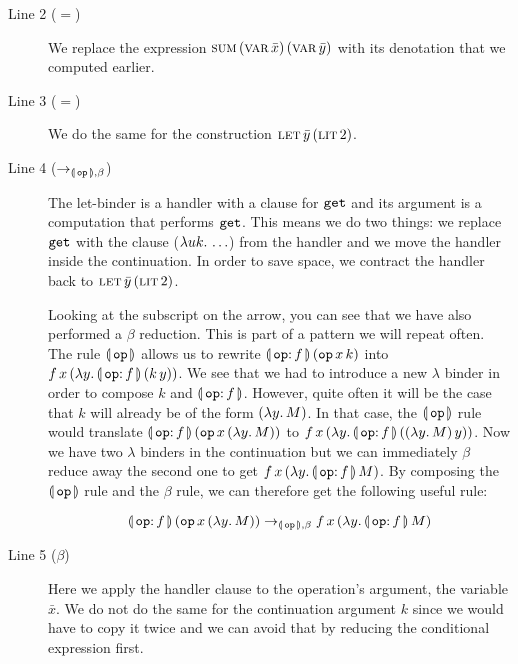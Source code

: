 \begin{description}

  \item[Line 2 ($=$)] We replace the expression
    $\textsc{sum}\,(\textsc{var}\,\bar{x})\,(\textsc{var}\,\bar{y})$ with its denotation that we computed
    earlier.

  \item[Line 3 ($=$)] We do the same for the construction
    $\textsc{let}\,\bar{y}\,(\textsc{lit}\,2)$.

  \item[Line 4 ($\to_{\llparenthesis \, \mathtt{op} \, \rrparenthesis,\beta}$)] The let-binder is a
    handler with a clause for $\mathtt{get}$ and its argument is a computation
    that performs $\mathtt{get}$. This means we do two things: we replace
    $\mathtt{get}$ with the clause ($\lambda u k.\, \ldots$) from the handler and
    we move the handler inside the continuation. In order to save space, we
    contract the handler back to $\textsc{let}\,\bar{y}\,(\textsc{lit}\,2)$.

    Looking at the subscript on the arrow, you can see that we have also
    performed a $\beta$ reduction. This is part of a pattern we will
    repeat often. The rule $\llparenthesis \, \mathtt{op} \, \rrparenthesis$ allows us to rewrite
    $\ap{\banana{\onto{\op{op}}{f}}}{(\app{\op{op}}{x}{k})}$ into
    $\app{f}{x}{(\lam{y}{\ap{\banana{\onto{\op{op}}{f}}}{(\ap{k}{y})}})}$. We
    see that we had to introduce a new $\lambda$ binder in order to compose
    $k$ and $\banana{\onto{\op{op}}{f}}$. However, quite often it will be
    the case that $k$ will already be of the form $(\lambda y.\, M)$. In that
    case, the $\llparenthesis \, \mathtt{op} \, \rrparenthesis$ rule would translate
    $\ap{\banana{\onto{\op{op}}{f}}}{(\app{\op{op}}{x}{(\lam{y}{M})})}$ to
    $\app{f}{x}{(\lam{y}{\ap{\banana{\onto{\op{op}}{f}}}{(\ap{(\lam{y}{M})}{y})}})}$. Now
    we have two $\lambda$ binders in the continuation but we can
    immediately $\beta$ reduce away the second one to get
    $\app{f}{x}{(\lam{y}{\ap{\banana{\onto{\op{op}}{f}}}{M}})}$. By
    composing the $\llparenthesis \, \mathtt{op} \, \rrparenthesis$ rule and the $\beta$ rule, we can
    therefore get the following useful rule:

    $$
    \ap{\banana{\onto{\op{op}}{f}}}{(\app{\op{op}}{x}{(\lam{y}{M})})}
    \to_{\banana{\op{op}},\beta}
    \app{f}{x}{(\lam{y}{\ap{\banana{\onto{\op{op}}{f}}}{M}})}
    $$

  \item[Line 5 ($\beta$)] Here we apply the handler clause to the
    operation's argument, the variable $\bar{x}$. We do not do the same for
    the continuation argument $k$ since we would have to copy it twice and
    we can avoid that by reducing the conditional expression first.


\end{description}
